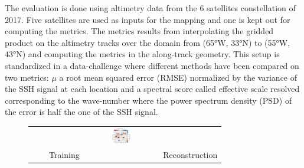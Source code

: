 \documentclass[draft]{agujournal2019}
\begin{document}
The evaluation is done using altimetry data from the 6 satellites constellation of 2017. Five satellites are used as inputs for the mapping and one is kept out for computing the metrics. The metrics results from interpolating the gridded product on the altimetry tracks  over the domain from (65°W, 33°N) to (55°W, 43°N) and computing the metrics in the along-track geometry. This setup is standardized in a data-challenge where different methods have been compared on two metrics: $\mu$ a root mean squared error (RMSE) normalized by the variance of the SSH signal at each location and a spectral score called effective scale resolved corresponding to the wave-number where the power spectrum density (PSD) of the error is half the one of the SSH signal.   

\begin{figure}[H]
\small
\begin{center}
\setlength{\tabcolsep}{1pt}
\begin{tabular}{ccccc}
 &&
&\hspace{-30mm} \includegraphics[trim={8mm 7cm 22mm 0},clip,width=3.0cm,height=0.7cm]{figures/plots/horizontal_cbar_vort.png} &\\
\hspace{0mm} &&
\hspace{-30mm} Training  
\hspace{3mm}  & 
 & 
\hspace{-30mm} Reconstruction \\



\end{tabular}
\end{center}
\end{figure}
\end{document}
